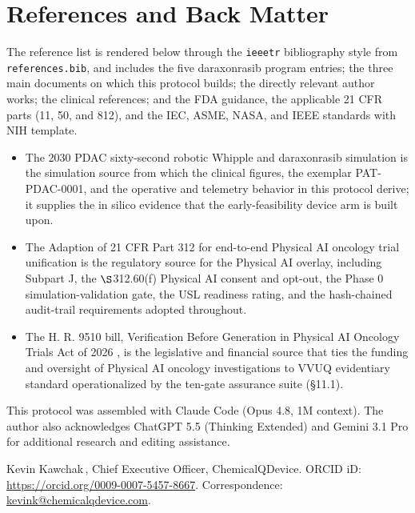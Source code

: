 \section{References and Back Matter}

The reference list is rendered below through the \texttt{ieeetr} bibliography
style from \texttt{references.bib}, and includes the five daraxonrasib program
entries; the three main documents on which this protocol builds; the directly
relevant author works; the clinical references; and the FDA guidance, the
applicable 21 CFR parts (11, 50, and 812), and the IEC, ASME, NASA, and IEEE standards with NIH template. 

\begin{itemize}[leftmargin=1.6em,itemsep=3pt,topsep=2pt]
\item The 2030 PDAC sixty-second robotic Whipple and daraxonrasib simulation
\cite{kawchak_2026_20196639} is the simulation source from which the clinical
figures, the exemplar PAT-PDAC-0001, and the operative and telemetry behavior in
this protocol derive; it supplies the in silico evidence that the early-feasibility
device arm is built upon.
\item The Adaption of 21 CFR Part 312 for end-to-end Physical AI oncology trial
unification \cite{kawchak2026adapt312} is the regulatory source for the Physical AI
overlay, including Subpart J, the $\S$312.60(f) Physical AI consent and opt-out,
the Phase 0 simulation-validation gate, the USL readiness rating, and the
hash-chained audit-trail requirements adopted throughout.
\item The H. R. 9510 bill, Verification Before Generation in Physical AI Oncology
Trials Act of 2026 \cite{kawchak2026hr9510}, is the legislative and financial
source that ties the funding and oversight of Physical AI oncology investigations
to VVUQ evidentiary standard operationalized by the ten-gate assurance suite
(\S11.1).
\end{itemize}

This protocol was assembled with Claude Code (Opus 4.8, 1M context). The author also acknowledges ChatGPT 5.5 (Thinking Extended) and Gemini 3.1 Pro for additional research and editing assistance.

Kevin Kawchak\,, Chief Executive Officer,
ChemicalQDevice. ORCID iD: \href{https://orcid.org/0009-0007-5457-8667}{https://orcid.org/0009-0007-5457-8667}.
Correspondence: \href{mailto:kevink@chemicalqdevice.com}{kevink@chemicalqdevice.com}.

